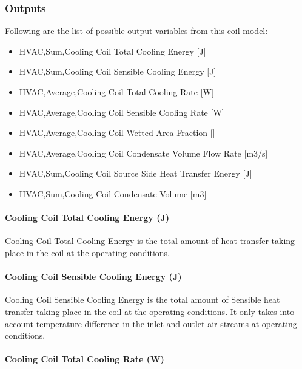 \subsubsection{Outputs}\label{outputs-015}

Following are the list of possible output variables from this coil model:

\begin{itemize}
\item
  HVAC,Sum,Cooling Coil Total Cooling Energy {[}J{]}
\item
  HVAC,Sum,Cooling Coil Sensible Cooling Energy {[}J{]}
\item
  HVAC,Average,Cooling Coil Total Cooling Rate {[}W{]}
\item
  HVAC,Average,Cooling Coil Sensible Cooling Rate {[}W{]}
\item
  HVAC,Average,Cooling Coil Wetted Area Fraction {[]}
\item
  HVAC,Average,Cooling Coil Condensate Volume Flow Rate {[}m3/s{]}
\item
  HVAC,Sum,Cooling Coil Source Side Heat Transfer Energy {[}J{]}
\item
  HVAC,Sum,Cooling Coil Condensate Volume {[}m3{]}
\end{itemize}

\paragraph{Cooling Coil Total Cooling Energy (J)}\label{cooling-coil-total-cooling-energy-j}

Cooling Coil Total Cooling Energy is the total amount of heat transfer taking place in the coil at the operating conditions.

\paragraph{Cooling Coil Sensible Cooling Energy (J)}\label{cooling-coil-sensible-cooling-energy-j}

Cooling Coil Sensible Cooling Energy is the total amount of Sensible heat transfer taking place in the coil at the operating conditions. It only takes into account temperature difference in the inlet and outlet air streams at operating conditions.

\paragraph{Cooling Coil Total Cooling Rate (W)}\label{cooling-coil-total-cooling-rate-w}

